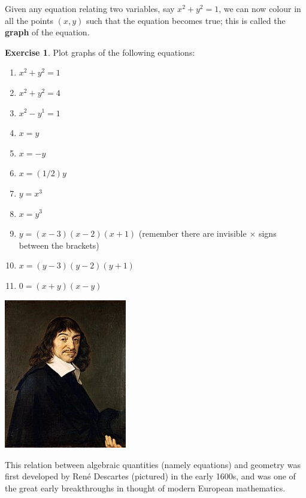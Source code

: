 \documentclass[a4paper]{report}
\theoremstyle{definition}
\newtheorem{exercise}[thm]{Exercise}
\newcommand{\df}[1]{\textbf{#1}\index{#1}}
\begin{document}
  Given any equation relating two variables, say $ x^2 + y^2 = 1 $, we can now colour in all the points $ (x,y) $ such that the equation becomes
  true; this is called the \df{graph} of the equation.

  \begin{exercise}
    Plot graphs of the following equations:
    \begin{enumerate}
      \item $ x^2 + y^2 = 1 $
      \item $ x^2 + y^2 = 4 $
      \item $ x^2 - y^1 = 1 $
      \item $ x = y $
      \item $ x = -y $
      \item $ x = (1/2)y $
      \item $ y = x^3 $
      \item $ x = y^3 $
      \item $ y = (x - 3)(x - 2)(x + 1) $ (remember there are invisible $ \times $ signs between the brackets)
      \item $ x = (y - 3)(y - 2)(y + 1) $
      \item $ 0 = (x + y)(x - y) $
    \end{enumerate}
  \end{exercise}

  \begin{center}
    \includegraphics[width=0.4\textwidth]{descartes}
  \end{center}

  This relation between algebraic quantities (namely equations) and geometry was first developed by Ren\'e Descartes (pictured)
  in the early 1600s, and was one of the great early breakthroughs in thought of modern European mathematics.
\end{document}
